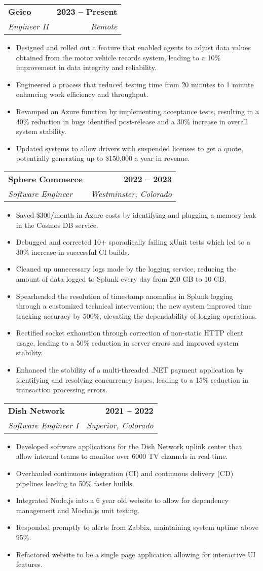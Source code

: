 \documentclass[letterpaper,11pt]{article}
\makeatletter
\newcommand{\resumeItem}[1]{
  \item\small{
    {#1 \vspace{2pt}}
  }
}
\newcommand{\resumeSubheading}[4]{
  \vspace{-2pt}\item
    \begin{tabular*}{1.0\textwidth}[t]{l@{\extracolsep{\fill}}r}
      \textbf{#1} & \textbf{\small #2} \\
      \textit{\small#3} & \textit{\small #4} \\
    \end{tabular*}\vspace{-7pt}
}
\newcommand{\resumeItemListStart}{\begin{itemize}}
\newcommand{\resumeItemListEnd}{\end{itemize}\vspace{-5pt}}
\makeatother
\begin{document}
  	\resumeSubheading
      {Geico}{2023 -- Present}
      {Engineer II}{Remote}
      \resumeItemListStart
	\resumeItem{Designed and rolled out a feature that enabled agents to adjust data values obtained from the motor vehicle records system, leading to a 10\% improvement in data integrity and reliability.}
	\resumeItem{Engineered a process that reduced testing time from 20 minutes to 1 minute enhancing work efficiency and throughput.}
	\resumeItem{Revamped an Azure function by implementing acceptance tests, resulting in a 40\% reduction in bugs identified post-release and a 30\% increase in overall system stability.}
        \resumeItem{Updated systems to allow drivers with suspended licenses to get a quote, potentially generating up to \$150,000 a year in revenue.}        	
      \resumeItemListEnd

    \resumeSubheading
      {Sphere Commerce}{2022 -- 2023}
      {Software Engineer}{Westminster, Colorado}
      \resumeItemListStart
	\resumeItem{Saved \$300/month in Azure costs by identifying and plugging a memory leak in the Cosmos DB service.}
        \resumeItem{Debugged and corrected 10+ sporadically failing xUnit tests which led to a 30\% increase in successful CI builds.}
	\resumeItem{Cleaned up unnecessary logs made by the logging service, reducing the amount of data logged to Splunk every day from 200 GB to 10 GB.}
        \resumeItem{
Spearheaded the resolution of timestamp anomalies in Splunk logging through a customized technical intervention; the new system improved time tracking accuracy by 500\%, elevating the dependability of logging operations. }       
	\resumeItem{Rectified socket exhaustion through correction of non-static HTTP client usage, leading to a 50\% reduction in server errors and improved system stability.}
	\resumeItem{Enhanced the stability of a multi-threaded .NET payment application by identifying and resolving concurrency issues, leading to a 15\% reduction in transaction processing errors.}
      \resumeItemListEnd

    \resumeSubheading
      {Dish Network}{2021 -- 2022}
      {Software Engineer I}{Superior, Colorado}
      \resumeItemListStart
        \resumeItem{Developed software applications for the Dish Network uplink center that allow internal teams to monitor over 6000 TV channels in real-time.}
	\resumeItem{Overhauled continuous integration (CI) and continuous delivery (CD) pipelines leading to 50\% faster builds.}
        \resumeItem{Integrated Node.js into a 6 year old website to allow for dependency management and Mocha.js unit testing.}
        \resumeItem{Responded promptly to alerts from Zabbix, maintaining system uptime above 95\%.}
\resumeItem{Refactored website to be a single page application allowing for interactive UI features.}
    \resumeItemListEnd
\end{document}
